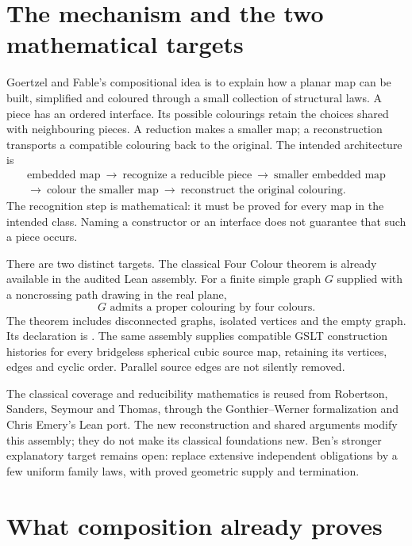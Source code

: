 \section{The mechanism and the two mathematical targets}
\label{sec:current-overview}

Goertzel and Fable's compositional idea is to explain how a planar map can
be built, simplified and coloured through a small collection of structural
laws. A piece has an ordered interface. Its possible colourings retain the
choices shared with neighbouring pieces. A reduction makes a smaller map;
a reconstruction transports a compatible colouring back to the original.
The intended architecture is
\[
\begin{gathered}
\text{embedded map}
\ \longrightarrow\ \text{recognize a reducible piece}
\ \longrightarrow\ \text{smaller embedded map}\\
\longrightarrow\ \text{colour the smaller map}
\ \longrightarrow\ \text{reconstruct the original colouring}.
\end{gathered}
\]
The recognition step is mathematical: it must be proved for every map in
the intended class. Naming a constructor or an interface does not guarantee
that such a piece occurs.

There are two distinct targets. The classical Four Colour theorem is
already available in the audited Lean assembly. For a finite simple graph
$G$ supplied with a noncrossing path drawing in the real plane,
\[
                  G\text{ admits a proper colouring by four colours}.
\]
The theorem includes disconnected graphs, isolated vertices and the empty
graph. Its declaration is
.
The same assembly supplies compatible GSLT construction histories for
every bridgeless spherical cubic source map, retaining its vertices,
edges and cyclic order. Parallel source edges are not silently removed.

The classical coverage and reducibility mathematics is reused from
Robertson, Sanders, Seymour and Thomas, through the Gonthier--Werner
formalization and Chris Emery's Lean port. The new reconstruction and shared
arguments modify this assembly; they do not make its classical foundations
new. Ben's stronger explanatory target remains open: replace extensive
independent obligations by a few uniform family laws, with proved geometric
supply and termination.

\section{What composition already proves}
\label{sec:current-witnesses}

